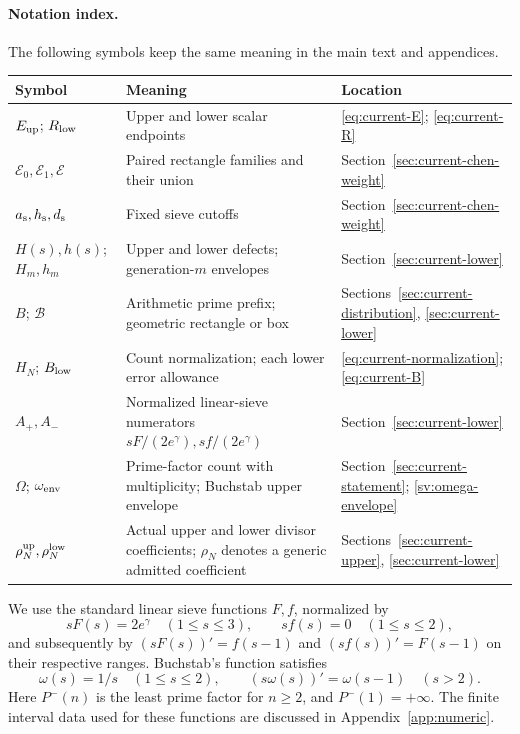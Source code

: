 \paragraph{Notation index.}
The following symbols keep the same meaning in the main text and appendices.
\begin{center}
\small
\begin{tabular}{@{}>{\raggedright\arraybackslash}p{}>{\raggedright\arraybackslash}p{}>{\raggedright\arraybackslash}p{}@{}}
\toprule Symbol & Meaning & Location\\
\midrule
$E_{\rm up}$; $R_{\rm low}$ & Upper and lower scalar endpoints & \eqref{eq:current-E}; \eqref{eq:current-R}\\[2pt]
$\mathscr E_0,\mathscr E_1,\mathscr E$ & Paired rectangle families and their union & Section~\ref{sec:current-chen-weight}\\[2pt]
$a_{\rm s},h_{\rm s},d_{\rm s}$ & Fixed sieve cutoffs & Section~\ref{sec:current-chen-weight}\\[2pt]
$H(s),h(s)$; $H_m,h_m$ & Upper and lower defects; generation-$m$ envelopes & Section~\ref{sec:current-lower}\\[2pt]
$B$; $\mathscr B$ & Arithmetic prime prefix; geometric rectangle or box & Sections~\ref{sec:current-distribution}, \ref{sec:current-lower}\\[2pt]
$H_N$; $B_{\rm low}$ & Count normalization; each lower error allowance & \eqref{eq:current-normalization}; \eqref{eq:current-B}\\[2pt]
$A_+,A_-$ & Normalized linear-sieve numerators $sF/(2e^\gamma),sf/(2e^\gamma)$ & Section~\ref{sec:current-lower}\\[2pt]
$\Omega$; $\omega_{\rm env}$ & Prime-factor count with multiplicity; Buchstab upper envelope & Section~\ref{sec:current-statement}; \eqref{sv:omega-envelope}\\[2pt]
$\rho_N^{\rm up},\rho_N^{\rm low}$ & Actual upper and lower divisor coefficients; $\rho_N$ denotes a generic admitted coefficient & Sections~\ref{sec:current-upper}, \ref{sec:current-lower}\\[2pt]
\bottomrule
\end{tabular}
\end{center}

We use the standard linear sieve functions $F,f$, normalized by
\[
 sF(s)=2e^\gamma\quad(1\le s\le3),\qquad
 sf(s)=0\quad(1\le s\le2),
\]
and subsequently by
$(sF(s))'=f(s-1)$ and $(sf(s))'=F(s-1)$ on their respective
ranges. Buchstab's function satisfies
\[
 \omega(s)=1/s\quad(1\le s\le2),\qquad
 (s\omega(s))'=\omega(s-1)\quad(s>2).
\]
Here $P^-(n)$ is the least prime factor for $n\ge2$, and $P^-(1)=+\infty$. The finite interval data used for these
functions are discussed in Appendix~\ref{app:numeric}.

